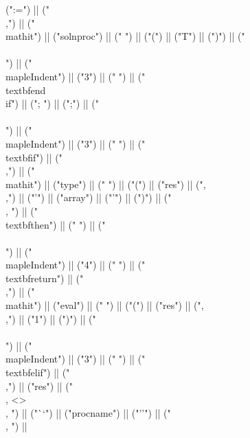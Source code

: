 \documentclass{article}
\begin{document}
\begin{center}
\begin{maplelatex}
{ (":=") || ("\\,") || ("\\mathit{") || ("solnproc") || ("} ") || ("(") || ("T") || (")") || ("\\\\\n") || ("\\mapleIndent{") || ("3") || ("} ") || ("\\textbf{end\\ if}") || ("; ") || (";") || ("\\\\\n") || ("\\mapleIndent{") || ("3") || ("} ") || ("\\textbf{if}") || (" \\,") || ("\\mathit{") || ("type") || ("} ") || ("(") || ("res") || (",\\,") || ("'") || ("array") || ("'") || (")") || (" \\, ") || ("\\textbf{then}") || (" ") || ("\\\\\n") || ("\\mapleIndent{") || ("4") || ("} ") || ("\\textbf{return}") || ("\\,") || ("\\mathit{") || ("eval") || ("} ") || ("(") || ("res") || (",\\,") || ("1") || (")") || ("\\\\\n") || ("\\mapleIndent{") || ("3") || ("} ") || ("\\textbf{elif}") || (" \\,") || ("res") || (" \\, <> \\, ") || ("``") || ("procname") || ("''") || (" \\, ") ||}
\end{maplelatex}
\end{center}
\end{document}
